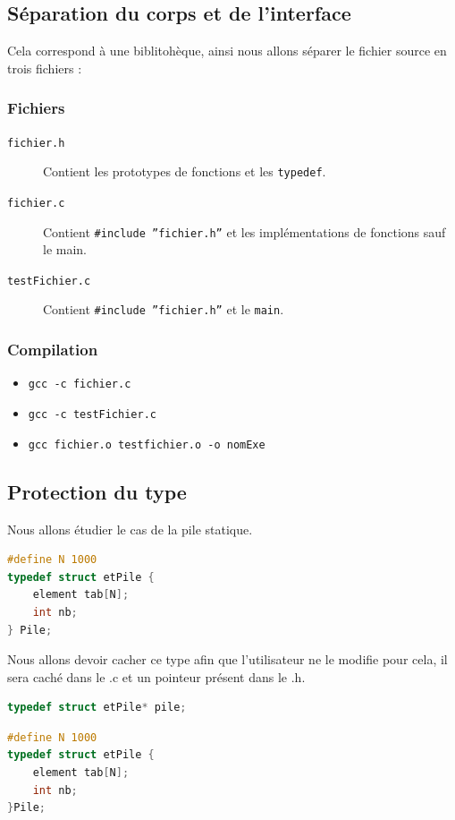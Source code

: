 \subsection{Séparation du corps et de l'interface}
	Cela correspond à une biblitohèque, ainsi nous allons séparer le fichier source en trois fichiers : 
	\subsubsection{Fichiers}
	\begin{description}
		\item[\texttt{fichier.h}] Contient les prototypes de fonctions et les \texttt{typedef}.
		\item[\texttt{fichier.c}] Contient \texttt{\#include ''fichier.h''} et les implémentations de fonctions sauf le main.
		\item[\texttt{testFichier.c}] Contient \texttt{\#include ''fichier.h''} et le \texttt{main}.
	\end{description}
	\subsubsection{Compilation}	
	\begin{itemize}
		\item \texttt{gcc -c fichier.c}
		\item \texttt{gcc -c testFichier.c}
		\item \texttt{gcc fichier.o testfichier.o -o nomExe}
	\end{itemize}
	\subsection{Protection du type}
	Nous allons étudier le cas de la pile statique.

\begin{lstlisting}[language=C, numbers=none,caption=Type de la pile statique originel -- Présent dans le .h]
#define N 1000
typedef struct etPile {
	element tab[N];
	int nb;
} Pile;
\end{lstlisting}

Nous allons devoir cacher ce type afin que l'utilisateur ne le modifie pour cela, il sera caché dans le .c et un pointeur présent dans le .h.
\begin{lstlisting}[language=C, numbers=none,frame=none, caption=Type de la pile statique -- Présent dans le .h]
typedef struct etPile* pile;
\end{lstlisting}
\begin{lstlisting}[language=C, numbers=none,caption=Type de la pile statique -- Présent dans le .c]
#define N 1000
typedef struct etPile {
	element tab[N];
	int nb;
}Pile;
\end{lstlisting}

